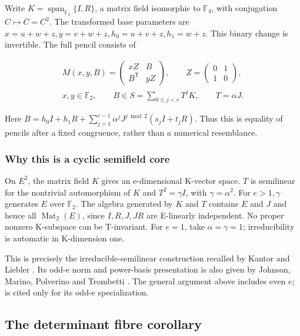 \documentclass[11pt,a4paper]{article}
\newcommand{\F}{\mathbb F}
\theoremstyle{definition}
\begin{document}
Write $K=\operatorname{span}_{\F_{2}}\{I,R\}$, a matrix field isomorphic to $\F_{4}$, with conjugation $C\mapsto \overline C=C^{2}$. The transformed base parameters are $x=u+w+z, y=v+w+z, h_{0}=u+v+z, h_{1}=w+z$. This binary change is invertible. The full pencil consists of


\begin{equation}\label{eq:181}
\begin{gathered}M(x,y,B)=\begin{pmatrix}xZ&B\\B^{\mathsf T}&yZ\end{pmatrix},\qquad Z=\begin{pmatrix}0&1\\1&0\end{pmatrix},\\x,y\in\F_2,\qquad B\in S=\sum_{0\le j<e}T^jK,\qquad T=\alpha J.\end{gathered}
\end{equation}

Here $B=h_{0}I+h_{1}R+\sum _{j=1}^{e-1}\alpha ^{j}J^{j\bmod 2}(s_{j}I+t_{j}R)$. Thus this is equality of pencils after a fixed congruence, rather than a numerical resemblance.


\subsubsection*{Why this is a cyclic semifield core}

On $E^{2}$, the matrix field $K$ gives an e-dimensional K-vector space. $T$ is semilinear for the nontrivial automorphism of $K$ and $T^{2}=\gamma I$, with $\gamma =\alpha ^{2}$. For $e>1, \gamma $ generates $E$ over $\F_{2}$. The algebra generated by $K$ and $T$ contains $E$ and $J$ and hence all $\operatorname{Mat}_{2}(E)$, since $I,R,J,JR$ are E-linearly independent. No proper nonzero K-subspace can be T-invariant. For $e=1$, take $\alpha =\gamma =1$; irreducibility is automatic in K-dimension one.


This is precisely the irreducible-semilinear construction recalled by Kantor and Liebler \cite[§2, p. 334]{ref5}. Its odd-e norm and power-basis presentation is also given by Johnson, Marino, Polverino and Trombetti \cite[Theorem 1(2), pp. 10--11]{ref6}. The general argument above includes even $e$; \cite{ref6} is cited only for its odd-e specialization.


\subsection{The determinant fibre corollary}
\end{document}
